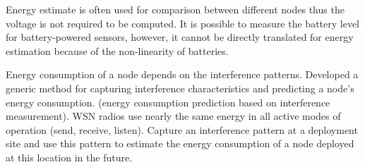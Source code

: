 Energy estimate is often used for comparison between different nodes thus the voltage is not required to be computed. It is possible to measure the battery level for battery-powered sensors, however, it cannot be directly translated for energy estimation because of the non-linearity of batteries.


Energy consumption of a node depends on the interference patterns. Developed a generic method for capturing interference characteristics and predicting a node's energy consumption. (energy consumption prediction based on interference measurement). WSN radios use nearly the same energy in all active modes of operation (send, receive, listen). Capture an interference pattern at a deployment site and use this pattern to estimate the energy consumption of a node deployed at this location in the future. \cite{alexlifetime}



